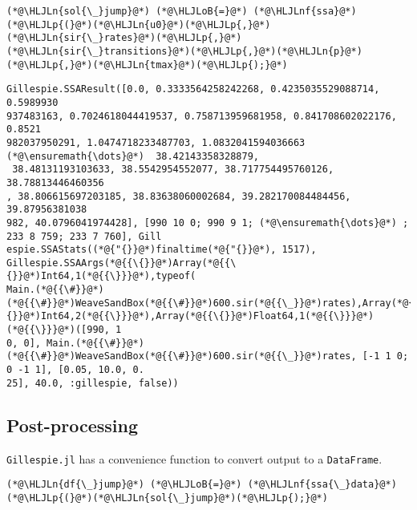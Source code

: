 \documentclass[12pt,a4paper]{article}
\newcommand{\HLJLn}[1]{#1}
\newcommand{\HLJLnf}[1]{\textcolor[RGB]{66,102,213}{#1}}
\newcommand{\HLJLoB}[1]{\textcolor[RGB]{102,102,102}{\textbf{#1}}}
\newcommand{\HLJLp}[1]{#1}
\begin{document}
\begin{lstlisting}
(*@\HLJLn{sol{\_}jump}@*) (*@\HLJLoB{=}@*) (*@\HLJLnf{ssa}@*)(*@\HLJLp{(}@*)(*@\HLJLn{u0}@*)(*@\HLJLp{,}@*)(*@\HLJLn{sir{\_}rates}@*)(*@\HLJLp{,}@*)(*@\HLJLn{sir{\_}transitions}@*)(*@\HLJLp{,}@*)(*@\HLJLn{p}@*)(*@\HLJLp{,}@*)(*@\HLJLn{tmax}@*)(*@\HLJLp{);}@*)
\end{lstlisting}

\begin{lstlisting}
Gillespie.SSAResult([0.0, 0.3333564258242268, 0.4235035529088714, 0.5989930
937483163, 0.7024618044419537, 0.758713959681958, 0.841708602022176, 0.8521
982037950291, 1.0474718233487703, 1.0832041594036663  (*@\ensuremath{\dots}@*)  38.42143358328879,
 38.48131193103633, 38.5542954552077, 38.717754495760126, 38.78813446460356
, 38.806615697203185, 38.83638060002684, 39.282170084484456, 39.87956381038
982, 40.0796041974428], [990 10 0; 990 9 1; (*@\ensuremath{\dots}@*) ; 233 8 759; 233 7 760], Gill
espie.SSAStats((*@{"{}}@*)finaltime(*@{"{}}@*), 1517), Gillespie.SSAArgs(*@{{\{}}@*)Array(*@{{\{}}@*)Int64,1(*@{{\}}}@*),typeof(
Main.(*@{{\#}}@*)(*@{{\#}}@*)WeaveSandBox(*@{{\#}}@*)600.sir(*@{{\_}}@*)rates),Array(*@{{\{}}@*)Int64,2(*@{{\}}}@*),Array(*@{{\{}}@*)Float64,1(*@{{\}}}@*)(*@{{\}}}@*)([990, 1
0, 0], Main.(*@{{\#}}@*)(*@{{\#}}@*)WeaveSandBox(*@{{\#}}@*)600.sir(*@{{\_}}@*)rates, [-1 1 0; 0 -1 1], [0.05, 10.0, 0.
25], 40.0, :gillespie, false))
\end{lstlisting}


\subsection{Post-processing}
\texttt{Gillespie.jl} has a convenience function to convert output to a \texttt{DataFrame}.


\begin{lstlisting}
(*@\HLJLn{df{\_}jump}@*) (*@\HLJLoB{=}@*) (*@\HLJLnf{ssa{\_}data}@*)(*@\HLJLp{(}@*)(*@\HLJLn{sol{\_}jump}@*)(*@\HLJLp{);}@*)
\end{lstlisting}
\end{document}
